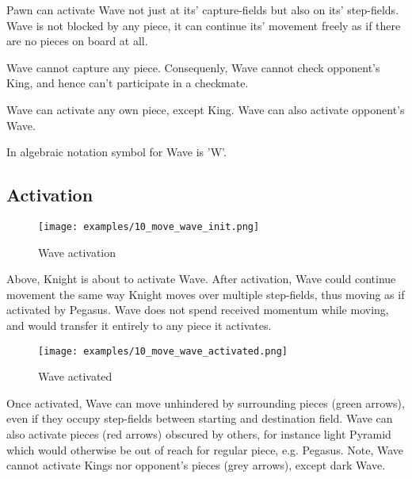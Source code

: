 Pawn can activate Wave not just at its' capture-fields but also on its'
step-fields. Wave is not blocked by any piece, it can continue its'
movement freely as if there are no pieces on board at all.

Wave cannot capture any piece. Consequenly, Wave cannot check opponent's
King, and hence can't participate in a checkmate.

Wave can activate any own piece, except King. Wave can also activate
opponent's Wave.

In algebraic notation symbol for Wave is 'W'.

\clearpage %

\subsection*{Activation}

\noindent
\begin{figure}[h]
\texttt{[image: examples/10\_move\_wave\_init.png]}
\caption{Wave activation}
\label{fig:10_move_wave_init}
\end{figure}

Above, Knight is about to activate Wave. After activation, Wave could
continue movement the same way Knight moves over multiple step-fields,
thus moving as if activated by Pegasus. Wave does not spend received
momentum while moving, and would transfer it entirely to any piece it
activates.

\clearpage %

\noindent
\begin{figure}[h]
\texttt{[image: examples/10\_move\_wave\_activated.png]}
\caption{Wave activated}
\label{fig:10_move_wave_activated}
\end{figure}

Once activated, Wave can move unhindered by surrounding pieces (green arrows),
even if they occupy step-fields between starting and destination field. Wave
can also activate pieces (red arrows) obscured by others, for instance light
Pyramid which would otherwise be out of reach for regular piece, e.g. Pegasus.
Note, Wave cannot activate Kings nor opponent's pieces (grey arrows), except
dark Wave.


